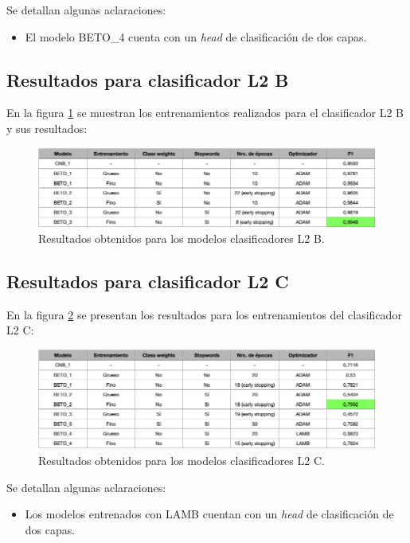 Se detallan algunas aclaraciones:
\begin{itemize}
	\item El modelo BETO\_4 cuenta con un \textit{head} de clasificación de dos capas.
\end{itemize}

\subsection{Resultados para clasificador L2 B}

En la figura \ref{fig:res-l2b} se muestran los entrenamientos realizados para el clasificador L2 B y sus resultados:

\begin{figure}[htbp]
	\centering
	\includegraphics[width=1\textwidth]{./Figures/cap4-resultados-l2b.png}
	\caption{Resultados obtenidos para los modelos clasificadores L2 B.}
	\label{fig:res-l2b}
\end{figure}

\subsection{Resultados para clasificador L2 C}

En la figura \ref{fig:res-l2c} se presentan los resultados para los entrenamientos del clasificador L2 C:

\begin{figure}[htbp]
	\centering
	\includegraphics[width=1\textwidth]{./Figures/cap4-resultados-l2c.png}
	\caption{Resultados obtenidos para los modelos clasificadores L2 C.}
	\label{fig:res-l2c}
\end{figure}

Se detallan algunas aclaraciones:
\begin{itemize}
	\item Los modelos entrenados con LAMB cuentan con un \textit{head} de clasificación de dos capas.
\end{itemize}

